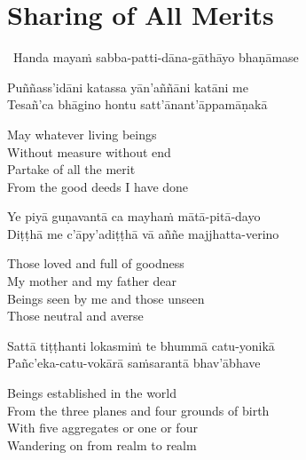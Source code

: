 \suttaRef{[Trad]}

\ifdigital{}\fi



\section{Sharing of All Merits}
\label{sharing-all-merits}

\begin{leader}
  \anglebracketleft\ \hspace{-0.5mm}Handa mayaṁ sabba-patti-dāna-gāthāyo bhaṇāmase \hspace{-0.5mm}\anglebracketright\
\end{leader}

Puññass'idāni katassa yān'aññāni katāni me\\
Tesañ'ca bhāgino hontu satt'ānant'āppamāṇakā

\begin{english-verses}
  May whatever living beings\\
  Without measure without end\\
  Partake of all the merit\\
  From the good deeds I have done
\end{english-verses}

Ye piyā guṇavantā ca mayhaṁ mātā-pitā-dayo\\
Diṭṭhā me c'āpy'adiṭṭhā vā aññe majjhatta-verino

\begin{english-verses}
  Those loved and full of goodness\\
  My mother and my father dear\\
  Beings seen by me and those unseen\\
  Those neutral and averse
\end{english-verses}

\ifninebythirteen\clearpage\fi

Sattā tiṭṭhanti lokasmiṁ te bhummā catu-yonikā\\
Pañc'eka-catu-vokārā saṁsarantā bhav'ābhave

\begin{english-verses}
  Beings established in the world\\
  From the three planes and four grounds of birth\\
  With five aggregates or one or four\\
  Wandering on from realm to realm
\end{english-verses}

